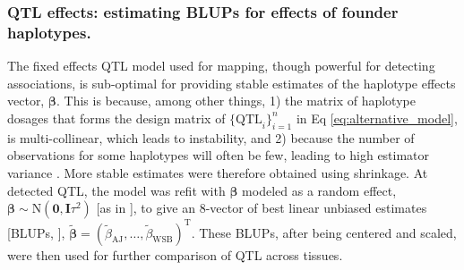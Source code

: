 \documentclass[9pt,twocolumn,twoside]{gsajnl}
\newcommand{\T}{^\mathrm{T}}
\newcommand{\bbeta}{\boldsymbol{\beta}}
\newcommand{\blup}{\widetilde{\bbeta}}
\newcommand{\bzero}{\mathbf{0}}
\newcommand{\bI}{\mathbf{I}}
\newcommand{\bx}{\mathbf{x}}
\newcommand{\tausq}{\tau^{2}}
\newcommand{\WV}[2]{\textcolor{red}{#1\footnote{\textcolor{red}{WV: #2}}}}
\begin{document}
\subsubsection{QTL effects: estimating BLUPs for effects of founder haplotypes.} 

The fixed effects QTL model used for mapping, though powerful for detecting associations, is sub-optimal for providing stable estimates of the haplotype effects vector, $\bbeta$. This is because, among other things, 1) the matrix of haplotype dosages that forms the design matrix of $\{\text{QTL}_i\}^n_{i=1}$ in Eq \ref{eq:alternative_model}, is multi-collinear, which leads to instability, and 2) because the number of observations for some haplotypes will often be few, leading to high estimator variance \citep{Zhang2014}. More stable estimates were therefore obtained using shrinkage. At detected QTL, the model was refit with $\bbeta$ modeled as a random effect, $\bbeta \sim \text{N}(\bzero, \bI\tausq)$ [as in \citet{Wei2016}], to give an 8-vector of best linear unbiased estimates [BLUPs, \citet{Robinson1991}], $\blup=(\widetilde{\beta}_\text{AJ},\dots,\widetilde{\beta}_\text{WSB})\T$. These BLUPs, after being centered and scaled, were then used for further comparison of QTL across tissues. 

\end{document}
